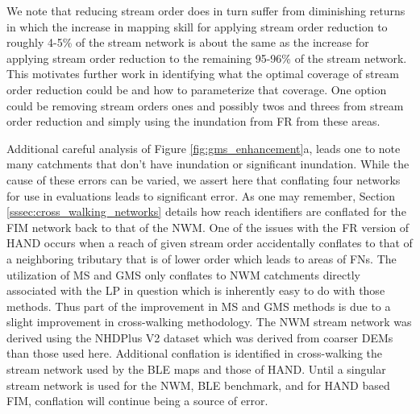 We note that reducing stream order does in turn suffer from diminishing returns in which the increase in mapping skill for applying stream order reduction to roughly 4-5\% of the stream network is about the same as the increase for applying stream order reduction to the remaining 95-96\% of the stream network.
This motivates further work in identifying what the optimal coverage of stream order reduction could be and how to parameterize that coverage. 
One option could be removing stream orders ones and possibly twos and threes from stream order reduction and simply using the inundation from FR from these areas.

Additional careful analysis of Figure \ref{fig:gms_enhancement}a, leads one to note many catchments that don't have inundation or significant inundation.
While the cause of these errors can be varied, we assert here that conflating four networks for use in evaluations leads to significant error.
As one may remember, Section \ref{sssec:cross_walking_networks} details how reach identifiers are conflated for the FIM network back to that of the NWM. 
One of the issues with the FR version of HAND occurs when a reach of given stream order accidentally conflates to that of a neighboring tributary that is of lower order which leads to areas of FNs.
The utilization of MS and GMS only conflates to NWM catchments directly associated with the LP in question which is inherently easy to do with those methods. 
Thus part of the improvement in MS and GMS methods is due to a slight improvement in cross-walking methodology.
The NWM stream network was derived using the NHDPlus V2 dataset which was derived from coarser DEMs than those used here. 
Additional conflation is identified in cross-walking the stream network used by the BLE maps and those of HAND.
Until a singular stream network is used for the NWM, BLE benchmark, and for HAND based FIM, conflation will continue being a source of error.


